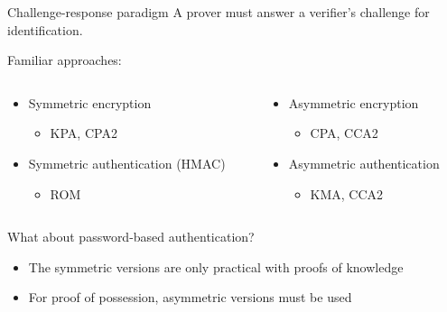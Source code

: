 \begin{frame}{Challenge-response paradigm}
  A prover must answer a verifier's challenge for identification.

  \vspace*{1em}

  \pause
  Familiar approaches:
  \begin{columns}[T,onlytextwidth]
    \begin{column}{0.5\textwidth}
      \begin{itemize}[<+(1)->]
        \item Symmetric encryption
        \begin{itemize}
          \item KPA, CPA2
        \end{itemize}
        \item Symmetric authentication (HMAC)
        \begin{itemize}
          \item ROM
        \end{itemize}
      \end{itemize}
    \end{column}
    \begin{column}{0.5\textwidth}
      \begin{itemize}[<+(1)->]
        \item Asymmetric encryption
        \begin{itemize}
          \item CPA, CCA2
        \end{itemize}
        \item Asymmetric authentication
        \begin{itemize}
          \item KMA, CCA2
        \end{itemize}
      \end{itemize}
    \end{column}
  \end{columns}

  \vspace*{1.5em}

  \pause
  What about password-based authentication?
  \begin{itemize}[<+(1)->]
    \item The symmetric versions are only practical with proofs of knowledge
    \item For proof of possession, asymmetric versions must be used
  \end{itemize}
\end{frame}

